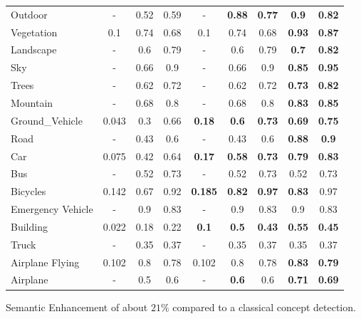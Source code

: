 \begin{frame}
\begin{tabular}{l||ccc|ccc|cc}
				Outdoor	&-&0.52&0.59&-&	\textbf{0.88}& \textbf{0.77} & \textbf{\alert{0.9}} & \textbf{\alert{0.82}}\\
				Vegetation& 0.1 & 0.74& 0.68& 0.1& 0.74 & 0.68 & \textbf{\alert{0.93}} & \textbf{\alert{0.87}} \\
				Landscape& -& 0.6& 0.79& -& 0.6 & 0.79& \textbf{\alert{0.7}} & \textbf{\alert{0.82}}\\
				Sky& -& 0.66& 0.9& -& 0.66& 0.9 & \textbf{\alert{0.85}} & \textbf{\alert{0.95}} \\
				Trees& -& 0.62& 0.72 & - & 0.62 & 0.72 & \textbf{\alert{0.73}} & \textbf{\alert{0.82}}\\
				Mountain& -& 0.68 & 0.8 & -  & 0.68 & 0.8 & \textbf{\alert{0.83}} & \textbf{\alert{0.85}} \\
				Ground\_Vehicle& 0.043  & 0.3& 0.66& \textbf{0.18} & \textbf{0.6} & \textbf{0.73} 
								& \textbf{\alert{0.69}}&\textbf{\alert{0.75}}\\
				Road& -& 0.43& 0.6 & -& 0.43& 0.6 & \textbf{\alert{0.88}} & \textbf{\alert{0.9}} \\
				Car  & 0.075 & 0.42 & 0.64& \textbf{0.17} & \textbf{0.58} & \textbf{0.73} 
								& \textbf{\alert{0.79}} & \textbf{\alert{0.83}}\\
				Bus& -& 0.52& 0.73& - & 0.52& 0.73 &0.52 & 0.73\\
				Bicycles& 0.142& 0.67& 0.92& \textbf{0.185}& \textbf{0.82}& \textbf{0.97} & \textbf{\alert{0.83}} & 0.97\\
				Emergency Vehicle& -& 0.9& 0.83& - & 0.9& 0.83 & 0.9& 0.83\\
				Building& 0.022& 0.18& 0.22& \textbf{0.1}& \textbf{0.5}& \textbf{0.43} & \textbf{\alert{0.55}} & \textbf{\alert{0.45}} \\
				Truck & -& 0.35& 0.37& -& 0.35& 0.37 & 0.35 & 0.37\\
				Airplane Flying & 0.102& 0.8 & 0.78& 0.102& 0.8& 0.78 & \textbf{\alert{0.83}} & \textbf{\alert{0.79}}  \\
				Airplane  & -& 0.5& 0.6& -& \textbf{0.6}& 0.6  & \textbf{\alert{0.71}} & \textbf{\alert{0.69}}\\
				\hline
		\end{tabular}
		\footnotesize
		\begin{exampleblock}{}
			Semantic Enhancement of about \alert{$21\%$} compared to a classical concept detection.
		\end{exampleblock}
\end{frame}

